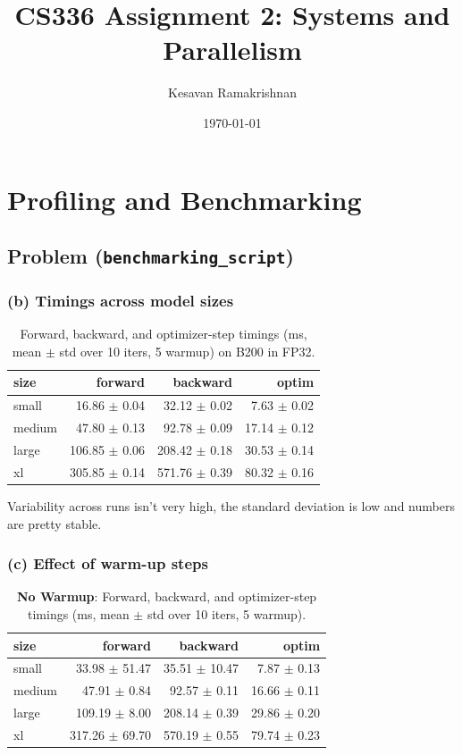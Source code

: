 \documentclass[11pt]{article}
\title{CS336 Assignment 2: Systems and Parallelism}
\author{Kesavan Ramakrishnan}
\date{\today}
\begin{document}
\maketitle

\setcounter{section}{1}

\section{Profiling and Benchmarking}


\subsection{Problem (\texttt{benchmarking\_script})}

\subsubsection*{(b) Timings across model sizes}

\begin{table}[H]
\centering
\caption{Forward, backward, and optimizer-step timings (ms, mean $\pm$ std over 10 iters, 5 warmup) on B200 in FP32.}
\begin{tabular}{lrrr}
\toprule
 size & forward & backward & optim \\
\midrule
small & 16.86 $\pm$ 0.04 & 32.12 $\pm$ 0.02 & 7.63 $\pm$ 0.02 \\
medium & 47.80 $\pm$ 0.13 & 92.78 $\pm$ 0.09 & 17.14 $\pm$ 0.12 \\
large & 106.85 $\pm$ 0.06 & 208.42 $\pm$ 0.18 & 30.53 $\pm$ 0.14 \\
xl & 305.85 $\pm$ 0.14 & 571.76 $\pm$ 0.39 & 80.32 $\pm$ 0.16 \\
\bottomrule
\end{tabular}
\end{table}


Variability across runs isn't very high, the standard deviation is low and numbers are pretty stable.

\vspace{4em}

\subsubsection*{(c) Effect of warm-up steps}

\begin{table}[H]
\centering
\caption{\textbf{No Warmup}: Forward, backward, and optimizer-step timings (ms, mean $\pm$ std over 10 iters, 5 warmup).}
\begin{tabular}{lrrr}
\toprule
 size & forward & backward & optim \\
\midrule
small & 33.98 $\pm$ 51.47 & 35.51 $\pm$ 10.47 & 7.87 $\pm$ 0.13 \\
medium & 47.91 $\pm$ 0.84 & 92.57 $\pm$ 0.11 & 16.66 $\pm$ 0.11 \\
large & 109.19 $\pm$ 8.00 & 208.14 $\pm$ 0.39 & 29.86 $\pm$ 0.20 \\
xl & 317.26 $\pm$ 69.70 & 570.19 $\pm$ 0.55 & 79.74 $\pm$ 0.23 \\
\bottomrule
\end{tabular}
\end{table}
\end{document}

